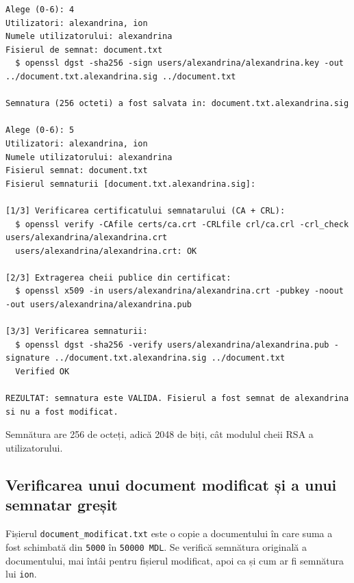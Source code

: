\documentclass[12pt,a4paper]{article}
\begin{document}
\begin{lstlisting}[style=terminal, caption={Semnarea documentului și verificarea reușită}]
Alege (0-6): 4
Utilizatori: alexandrina, ion
Numele utilizatorului: alexandrina
Fisierul de semnat: document.txt
  $ openssl dgst -sha256 -sign users/alexandrina/alexandrina.key -out ../document.txt.alexandrina.sig ../document.txt

Semnatura (256 octeti) a fost salvata in: document.txt.alexandrina.sig

Alege (0-6): 5
Utilizatori: alexandrina, ion
Numele utilizatorului: alexandrina
Fisierul semnat: document.txt
Fisierul semnaturii [document.txt.alexandrina.sig]:

[1/3] Verificarea certificatului semnatarului (CA + CRL):
  $ openssl verify -CAfile certs/ca.crt -CRLfile crl/ca.crl -crl_check users/alexandrina/alexandrina.crt
  users/alexandrina/alexandrina.crt: OK

[2/3] Extragerea cheii publice din certificat:
  $ openssl x509 -in users/alexandrina/alexandrina.crt -pubkey -noout -out users/alexandrina/alexandrina.pub

[3/3] Verificarea semnaturii:
  $ openssl dgst -sha256 -verify users/alexandrina/alexandrina.pub -signature ../document.txt.alexandrina.sig ../document.txt
  Verified OK

REZULTAT: semnatura este VALIDA. Fisierul a fost semnat de alexandrina si nu a fost modificat.
\end{lstlisting}

Semnătura are 256 de octeți, adică 2048 de biți, cât modulul cheii RSA a
utilizatorului.

\subsection{Verificarea unui document modificat și a unui semnatar greșit}

Fișierul \texttt{document\_modificat.txt} este o copie a documentului în care
suma a fost schimbată din \texttt{5000} în \texttt{50000 MDL}. Se verifică
semnătura originală a documentului, mai întâi pentru fișierul modificat, apoi
ca și cum ar fi semnătura lui \texttt{ion}.
\end{document}
